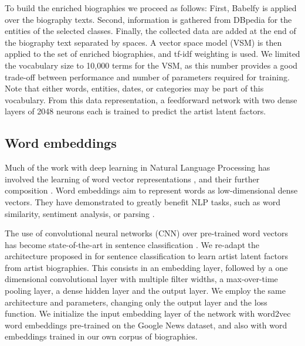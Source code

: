 To build the enriched biographies we proceed as follows: First, Babelfy is applied over the biography texts. Second, information is gathered from DBpedia for the entities of the selected classes. Finally, the collected data are added at the end of the biography text separated by spaces. A vector space model (VSM) is then applied to the set of enriched biographies, and tf-idf weighting \cite{Zobel1998} is used. We limited the vocabulary size to 10,000 terms for the VSM, as this number provides a good trade-off between performance and number of parameters required for training. Note that either words, entities, dates, or categories may be part of this vocabulary. From this data representation, a feedforward network with two dense layers of 2048 neurons each is trained to predict the artist latent factors.

\subsection{Word embeddings}\label{sec:cold-rec:w2v}

Much of the work with deep learning in Natural Language Processing has involved the learning of word vector representations \cite{Bengio2003,Mikolov2013}, and their further composition \cite{Collobert2011}. Word embeddings aim to represent words as low-dimensional dense vectors. They have demonstrated to greatly benefit NLP tasks, such as word similarity, sentiment analysis, or parsing \cite{Nguyen2016}. 

The use of convolutional neural networks (CNN) over pre-trained word vectors has become state-of-the-art in sentence classification \cite{Kim2014}. 
We re-adapt the architecture proposed in \cite{Kim2014} for sentence classification to learn artist latent factors from artist biographies. This consists in an embedding layer, followed by a one dimensional convolutional layer with multiple filter widths, a max-over-time pooling layer, a dense hidden layer and the output layer. We employ the same architecture and parameters, changing only the output layer and the loss function. We initialize the input embedding layer of the network with word2vec word embeddings pre-trained on the Google News dataset, and also with word embeddings trained in our own corpus of biographies.



